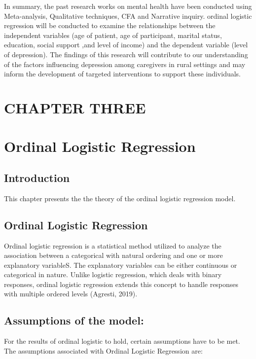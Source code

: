 \documentclass[12pt]{article}
\numberwithin{equation}{section}
\begin{document}
	\noindent In summary, the past research works on mental health have been conducted using Meta-analysis, Qualitative techniques, CFA and Narrative inquiry. ordinal logistic regression will be conducted to examine the relationships between the independent variables (age of patient, age of participant, marital status, education, social support ,and level of income) and the dependent	variable (level of depression). The findings of this research will contribute to	our understanding of the factors influencing depression among caregivers in rural settings and may inform the development of targeted interventions to support these individuals. 
\newpage
\section*{CHAPTER THREE}
\section*{Ordinal Logistic Regression}
\label{sec:Methodology}
\setcounter{section}{3}
\setcounter{subsection}{0}

\subsection{Introduction}
This chapter presents the the theory of the ordinal logistic regression model.

\subsection{Ordinal Logistic Regression}

Ordinal logistic regression is a statistical method utilized to analyze the association between a categorical with natural ordering and one or more explanatory variableS. The explanatory variables can be either continuous or categorical in nature. Unlike logistic regression, which deals with binary responses, ordinal logistic regression extends this concept to handle responses with multiple ordered levels (Agresti, 2019).

\subsection{Assumptions of the model:}
For the results of ordinal logistic to hold, certain assumptions have to be met. The assumptions associated with Ordinal Logistic Regression are:
\end{document}
